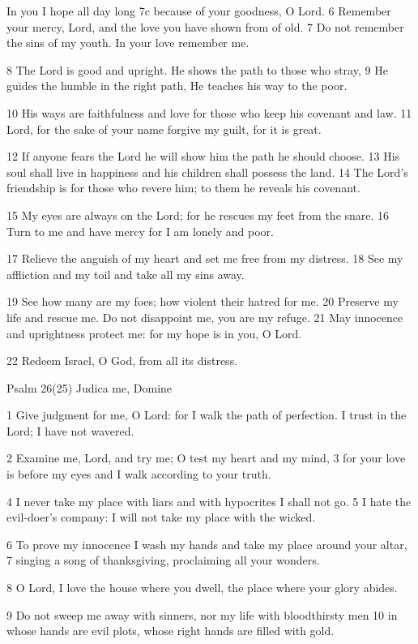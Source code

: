 In you I hope all day long
7c because of your goodness, O Lord.
6 Remember your mercy, Lord,
and the love you have shown from of old.
7 Do not remember the sins of my youth.
In your love remember me.

8 The Lord is good and upright.
He shows the path to those who stray,
9 He guides the humble in the right path,
He teaches his way to the poor.

10 His ways are faithfulness and love
for those who keep his covenant and law.
11 Lord, for the sake of your name
forgive my guilt, for it is great.

12 If anyone fears the Lord
he will show him the path he should choose.
13 His soul shall live in happiness
and his children shall possess the land.
14 The Lord's friendship is for those who revere him;
to them he reveals his covenant.

15 My eyes are always on the Lord;
for he rescues my feet from the snare.
16 Turn to me and have mercy
for I am lonely and poor.

17 Relieve the anguish of my heart
and set me free from my distress.
18 See my affliction and my toil
and take all my sins away.

19 See how many are my foes;
how violent their hatred for me.
20 Preserve my life and rescue me.
Do not disappoint me, you are my refuge.
21 May innocence and uprightness protect me:
for my hope is in you, O Lord.

22 Redeem Israel, O God, from all its distress.


Psalm 26(25) Judica me, Domine

1 Give judgment for me, O Lord:
for I walk the path of perfection.
I trust in the Lord; I have not wavered.

2 Examine me, Lord, and try me;
O test my heart and my mind,
3 for your love is before my eyes
and I walk according to your truth.

4 I never take my place with liars
and with hypocrites I shall not go.
5 I hate the evil-doer's company:
I will not take my place with the wicked.

6 To prove my innocence I wash my hands
and take my place around your altar,
7 singing a song of thanksgiving,
proclaiming all your wonders.

8 O Lord, I love the house where you dwell,
the place where your glory abides.

9 Do not sweep me away with sinners,
nor my life with bloodthirsty men
10 in whose hands are evil plots,
whose right hands are filled with gold.

